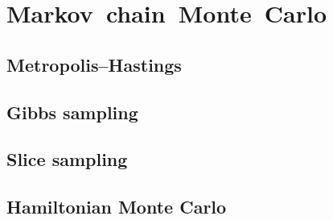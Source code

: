 \chapter{\mbox{Markov chain Monte Carlo}}\label{ch:markov-chain-monte-carlo}

\section{Metropolis--Hastings}

\section{Gibbs sampling}

\section{Slice sampling}

\section{Hamiltonian Monte Carlo}